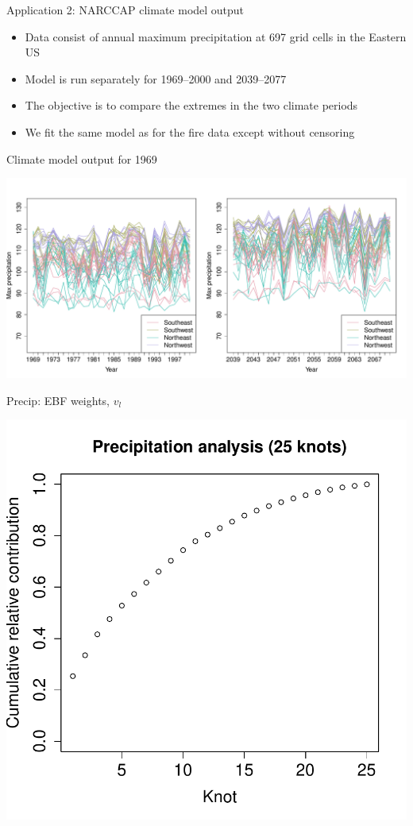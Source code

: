\documentclass{beamer}
\begin{document}
\begin{frame}{Application 2: NARCCAP climate model output}
	\begin{itemize}\setlength{\itemsep}{1em}
		\item Data consist of annual maximum precipitation at 697 grid cells in the Eastern US
		\item Model is run separately for 1969--2000 and 2039--2077
		\item The objective is to compare the extremes in the two climate periods
		\item We fit the same model as for the fire data except without censoring
	\end{itemize}
\end{frame}


\begin{frame}{Climate model output for 1969}
	\begin{center}
		\includegraphics[width=\textwidth]{precip-ts}
	\end{center}
\end{frame}

\begin{frame}{Precip: EBF weights, $v_l$}
	\begin{center}
		\includegraphics[height=0.85\textheight]{precipv-25}
	\end{center}
\end{frame}
\end{document}
